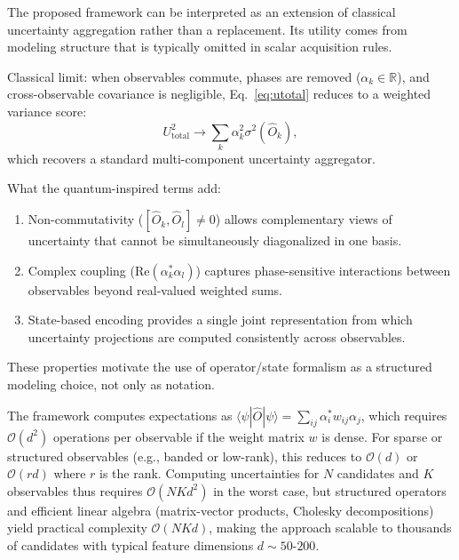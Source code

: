 \documentclass[conference]{IEEEtran}
\begin{document}
The proposed framework can be interpreted as an extension of classical uncertainty aggregation rather than a replacement. Its utility comes from modeling structure that is typically omitted in scalar acquisition rules.

Classical limit: when observables commute, phases are removed ($\alpha_k \in \mathbb{R}$), and cross-observable covariance is negligible, Eq.~\eqref{eq:utotal} reduces to a weighted variance score:
\begin{equation}
U_{\text{total}}^2 \rightarrow \sum_k \alpha_k^2\sigma^2(\hat{O}_k),
\end{equation}
which recovers a standard multi-component uncertainty aggregator.

What the quantum-inspired terms add:
\begin{enumerate}
    \item Non-commutativity ($[\hat{O}_k,\hat{O}_l] \neq 0$) allows complementary views of uncertainty that cannot be simultaneously diagonalized in one basis.
    \item Complex coupling ($\text{Re}(\alpha_k^*\alpha_l)$) captures phase-sensitive interactions between observables beyond real-valued weighted sums.
    \item State-based encoding provides a single joint representation from which uncertainty projections are computed consistently across observables.
\end{enumerate}
These properties motivate the use of operator/state formalism as a structured modeling choice, not only as notation.

The framework computes expectations as $\langle\psi|\hat{O}|\psi\rangle = \sum_{ij} \alpha_i^* w_{ij} \alpha_j$, which requires $\mathcal{O}(d^2)$ operations per observable if the weight matrix $w$ is dense. For sparse or structured observables (e.g., banded or low-rank), this reduces to $\mathcal{O}(d)$ or $\mathcal{O}(rd)$ where $r$ is the rank. Computing uncertainties for $N$ candidates and $K$ observables thus requires $\mathcal{O}(NKd^2)$ in the worst case, but structured operators and efficient linear algebra (matrix-vector products, Cholesky decompositions) yield practical complexity $\mathcal{O}(NKd)$, making the approach scalable to thousands of candidates with typical feature dimensions $d \sim 50$-$200$.
\end{document}
